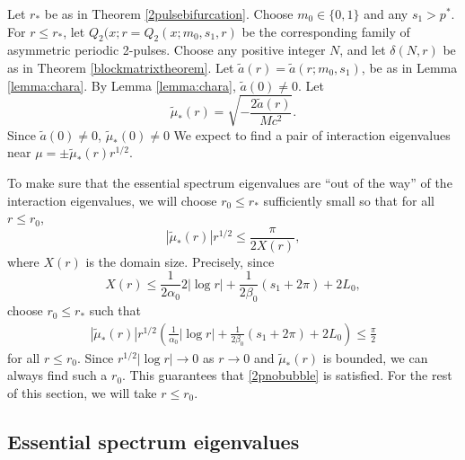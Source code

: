 \documentclass[thesis.tex]{subfiles}
\begin{document}
Let $r_*$ be as in Theorem \ref{2pulsebifurcation}. Choose $m_0 \in \{ 0, 1\}$ and any $s_1 > p^*$. For $r \leq r_*$, let $Q_2(x; r = Q_2(x; m_0, s_1, r)$ be the corresponding family of asymmetric periodic 2-pulses. Choose any positive integer $N$, and let $\delta(N,r)$ be as in Theorem \ref{blockmatrixtheorem}. Let $\tilde{a}(r) = \tilde{a}(r; m_0, s_1)$, be as in Lemma \cref{lemma:chara}. By Lemma \cref{lemma:chara}, $\tilde{a}(0) \neq 0$. Let
\begin{equation}\label{2ptildemustar}
\tilde{\mu}_*(r) = \sqrt{-\frac{2\tilde{a}(r)}{M c^2}}.
\end{equation}
Since $\tilde{a}(0) \neq 0$, $\tilde{\mu}_*(0) \neq 0$
We expect to find a pair of interaction eigenvalues near $\mu = \pm \tilde{\mu}_*(r) r^{1/2}$. 

To make sure that the essential spectrum eigenvalues are ``out of the way'' of the interaction eigenvalues, we will choose $r_0 \leq r_*$ sufficiently small so that for all $r \leq r_0$,
\begin{equation}\label{2pnobubble}
\left|\tilde{\mu}_*(r) \right| r^{1/2}  \leq \frac{\pi}{2 X(r)},
\end{equation}
where $X(r)$ is the domain size. Precisely, since
\[
X(r) \leq \frac{1}{2 \alpha_0} 2 |\log r| + \frac{1}{2\beta_0}\left( s_1 + 2 \pi \right) + 2 L_0, 
\]
choose $r_0 \leq r_*$ such that
\begin{align}\label{2pnobubblecond}
\left|\tilde{\mu}_*(r) \right| r^{1/2} \left( \frac{1}{\alpha_0} |\log r| + \frac{1}{2\beta_0}\left( s_1 + 2 \pi \right) + 2 L_0 \right) \leq \frac{\pi}{2}
\end{align}
for all $r \leq r_0$. Since $r^{1/2}|\log r| \rightarrow 0$ as $r \rightarrow 0$ and $\tilde{\mu}_*(r)$ is bounded, we can always find such a $r_0$. This guarantees that \cref{2pnobubble} is satisfied. For the rest of this section, we will take $r \leq r_0$.

\subsection{Essential spectrum eigenvalues}
\end{document}
